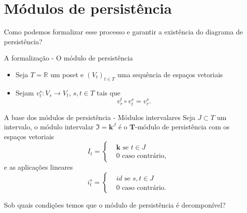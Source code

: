 \documentclass[10pt]{beamer}
\begin{document}
\section{Módulos de persistência}

\begin{frame}[standout]
    \centering
    {\Large Como podemos formalizar esse processo e garantir a existência
    do diagrama de persistência?}
\end{frame} 

\begin{frame}{A formalização - O módulo de persistência}
    \begin{itemize}
        \item Seja $T = \mathbb{R}$ um poset e $(V_t)_{t \in T}$ uma sequência de espaços vetoriais
        \item Sejam $v_t^s \colon V_s \to V_t$, $s,t \in T$ tais que 
                \begin{equation*}
                    v^t_r \circ v^s_t = v^s_r.
                \end{equation*}
    \end{itemize}
\end{frame}

\begin{frame}{A base dos módulos de persistência - Módulos intervalares}
    Seja $J \subset T$ um intervalo, o módulo intervalar $\mathfrak{I} = \mathbf{k}^J$ 
    é o $\mathbf{T}$-módulo de persistência com os espaços vetoriais 
    \begin{equation*}
    I_t = \left\{
    \begin{split}
        & \mathbf{k} \text{ se } t \in J \\
        & 0 \text{ caso contrário,}
    \end{split}
    \right.
\end{equation*} 
e as aplicações lineares
\begin{equation*}
    i_t^s = \left\{
    \begin{split}
        & id \text{ se } s,t \in J \\
        & 0 \text{ caso contrário.}
    \end{split}
    \right.
\end{equation*}

\end{frame}

\begin{frame}[standout]
    \centering
    {\Large Sob quais condições temos que o módulo de persistência é decomponível?} 
\end{frame}
\end{document}
